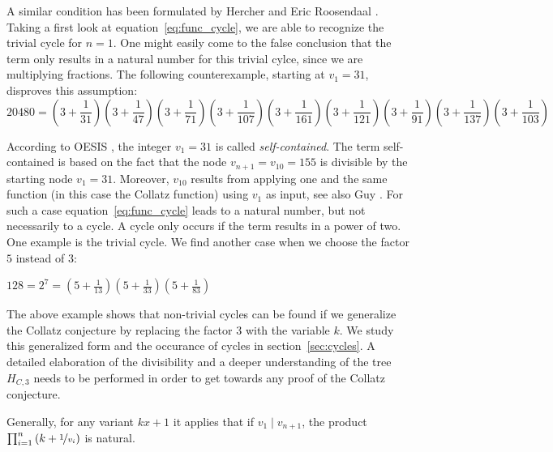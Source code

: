 A similar condition has been formulated by Hercher \cite{Ref_Hercher} and Eric Roosendaal \cite{Ref_Roosendaal_2020}. Taking a first look at equation~\ref{eq:func_cycle}, we are able to recognize the trivial cycle for $n=1$. One might easily come to the false conclusion that the term only results in a natural number for this trivial cylce, since we are multiplying fractions. The following counterexample, starting at $v_1=31$, disproves this assumption:
\begin{equation*}
20480=\left(3+\frac{1}{31}\right)\left(3+\frac{1}{47}\right)
\left(3+\frac{1}{71}\right)\left(3+\frac{1}{107}\right)\left(3+\frac{1}{161}\right)\left(3+\frac{1}{121}\right)\left(3+\frac{1}{91}\right)\left(3+\frac{1}{137}\right)\left(3+\frac{1}{103}\right)
\end{equation*}

According to OESIS \cite{Ref_OESIS}, the integer $v_1=31$ is called \textit{self-contained}. The term self-contained is based on the fact that the node $v_{n+1}=v_{10}=155$ is divisible by the starting node $v_1=31$. Moreover, $v_{10}$ results from applying one and the same function (in this case the Collatz function) using $v_1$ as input, see also Guy \cite[p.~332]{Ref_Guy}. For such a case equation~\ref{eq:func_cycle} leads to a natural number, but not necessarily to a cycle. A cycle only occurs if the term results in a power of two. One example is the trivial cycle. We find another case when we choose the factor $5$ instead of $3$:
\begin{center}
	$128=2^7=\left(5+\frac{1}{13}\right)\left(5+\frac{1}{33}\right)
	\left(5+\frac{1}{83}\right)$
\end{center}

The above example shows that non-trivial cycles can be found if we generalize the Collatz conjecture by replacing the factor $3$ with the variable $k$. We study this generalized form and the occurance of cycles in section~\ref{sec:cycles}. A detailed elaboration of the divisibility and a deeper understanding of the tree $H_{C,3}$ needs to be performed in order to get towards any proof of the Collatz conjecture.

Generally, for any variant $kx+1$ it applies that if $v_1\mid v_{n+1}$, the product $\prod_{i=1}^n\left(k+\nicefrac{1}{v_i}\right)$ is natural.

\newpage

